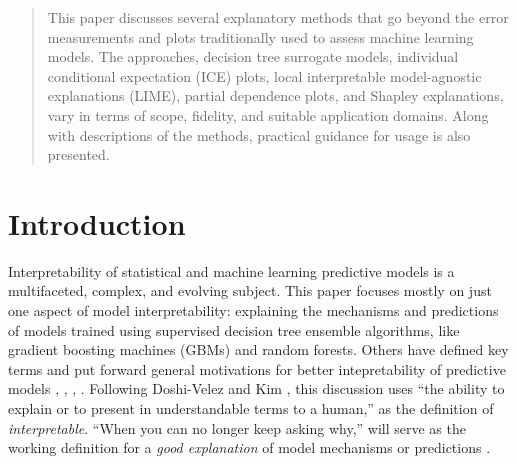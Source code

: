 \documentclass{article}
\begin{document}
 


\begin{abstract} 
	
This paper discusses several explanatory methods that go beyond the error measurements and plots traditionally used to assess machine learning models. The approaches, decision tree surrogate models, individual conditional expectation (ICE) plots, local interpretable model-agnostic explanations (LIME), partial dependence plots, and Shapley explanations, vary in terms of scope, fidelity, and suitable application domains. Along with descriptions of the methods, practical guidance for usage is also presented.

\end{abstract} 

\section{Introduction}

Interpretability of statistical and machine learning predictive models is a multifaceted, complex, and evolving subject. This paper focuses mostly on just one aspect of model interpretability: explaining the mechanisms and predictions of models trained using supervised decision tree ensemble algorithms, like gradient boosting machines (GBMs) and random forests. Others have defined key terms and put forward general motivations for better intepretability of predictive models \cite{lipton1}, \cite{been_kim1}, \cite{gilpin2018explaining}, \cite{guidotti2018survey}. Following Doshi-Velez and Kim , this discussion uses ``the ability to explain or to present in understandable terms to a human,'' as the definition of \textit{interpretable}. ``When you can no longer keep asking why,'' will serve as the working definition for a \textit{good explanation} of model mechanisms or predictions \cite{gilpin2018explaining}. 
	
\end{document}
